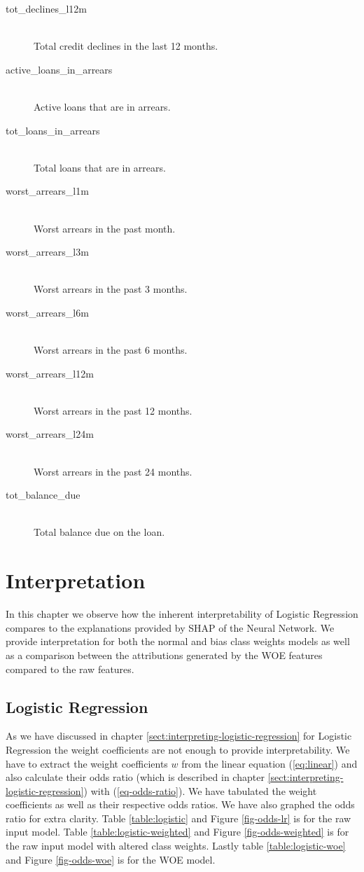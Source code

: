 \begin{description}
     \item[tot\_declines\_l12m] \hfill \\ Total credit declines in the last 12 months.
     \item[active\_loans\_in\_arrears] \hfill \\ Active loans that are in arrears.
     \item[tot\_loans\_in\_arrears] \hfill \\ Total loans that are in arrears.
     \item[worst\_arrears\_l1m] \hfill \\ Worst arrears in the past month.
     \item[worst\_arrears\_l3m] \hfill \\ Worst arrears in the past 3 months.
     \item[worst\_arrears\_l6m] \hfill \\ Worst arrears in the past 6 months.
     \item[worst\_arrears\_l12m] \hfill \\ Worst arrears in the past 12 months.
     \item[worst\_arrears\_l24m] \hfill \\ Worst arrears in the past 24 months.
     \item[tot\_balance\_due] \hfill \\ Total balance due on the loan.
 \end{description}
\section{Interpretation} \label{sec-interpretation}
In this chapter we observe how the inherent interpretability of Logistic Regression compares to the explanations provided by SHAP of the Neural Network. We provide interpretation for both the normal and bias class weights models as well as a comparison between the attributions generated by the WOE features compared to the raw features.
\subsection{Logistic Regression}
As we have discussed in chapter \ref{sect:interpreting-logistic-regression} for Logistic Regression the weight coefficients are not enough to provide interpretability.  We have to extract the weight coefficients $w$ from the linear equation (\ref{eq:linear}) and also calculate their odds ratio (which is described in chapter \ref{sect:interpreting-logistic-regression}) with (\ref{eq-odds-ratio}). We have tabulated the weight coefficients as well as their respective odds ratios. We have also graphed the odds ratio for extra clarity. Table \ref{table:logistic} and Figure \ref{fig-odds-lr}  is for the raw input model. Table \ref{table:logistic-weighted} and Figure \ref{fig-odds-weighted} is for the raw input model with altered class weights. Lastly table \ref{table:logistic-woe} and Figure \ref{fig-odds-woe} is for the WOE model.

